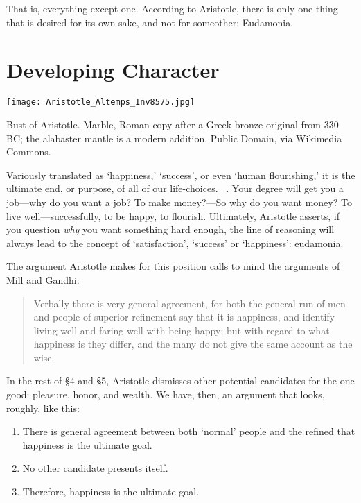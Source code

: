 That is, everything except one. According to Aristotle, there is only one thing that is desired for its own sake, and not for someother: Eudamonia.

\section{Developing Character}
\label{developingcharacter}

\begin{marginfigure}\texttt{[image: Aristotle\_Altemps\_Inv8575.jpg]}\caption{Bust of Aristotle. Marble, Roman copy after a Greek bronze original from 330 BC; the alabaster mantle is a modern addition. Public Domain, via Wikimedia Commons.}\label{fig:aristotle}\end{marginfigure} Variously translated as `happiness,' `success', or even `human flourishing,' it is the ultimate end, or purpose, of all of our life-choices. ~\citep[1094b16--19]{Aristotle:1995uq}. Your degree will get you a job---why do you want a job? To make money?---So why do you want money? To live well---successfully, to be happy, to flourish. Ultimately, Aristotle asserts, if you question \emph{why} you want something hard enough, the line of reasoning will always lead to the concept of `satisfaction', `success' or `happiness': eudamonia.

The argument Aristotle makes for this position calls to mind the arguments of Mill and Gandhi:

\begin{quote}

Verbally there is very general agreement, for both the general run of men and people of superior refinement say that it is happiness, and identify living well and faring well with being happy; but with regard to what happiness is they differ, and the many do not give the same account as the wise. ~\citep[1095a16--21]{Aristotle:1995uq}
\end{quote}

In the rest of \S4 and \S5, Aristotle dismisses other potential candidates for the one good: pleasure, honor, and wealth. We have, then, an argument that looks, roughly, like this:

\begin{enumerate}
\item There is general agreement between both `normal' people and the refined that happiness is the ultimate goal.

\item No other candidate presents itself.

\item Therefore, happiness is the ultimate goal.

\end{enumerate}

